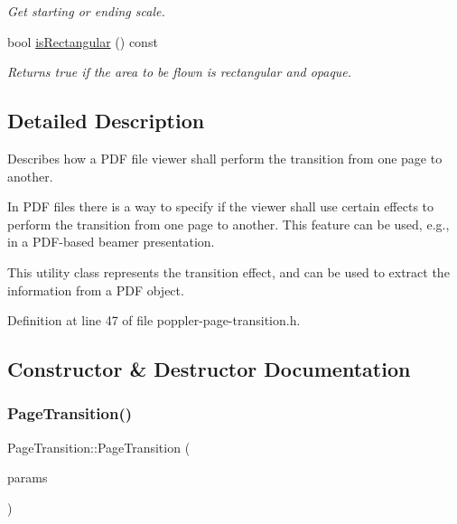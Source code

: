\begin{DoxyCompactItemize}
\begin{DoxyCompactList}\small\item\em Get starting or ending scale. \end{DoxyCompactList}\item 
\mbox{\label{class_poppler_1_1_page_transition_a43ed82dde65f4369f037a35227ee5acd}} 
bool \hyperlink{class_poppler_1_1_page_transition_a43ed82dde65f4369f037a35227ee5acd}{is\+Rectangular} () const
\begin{DoxyCompactList}\small\item\em Returns true if the area to be flown is rectangular and opaque. \end{DoxyCompactList}\end{DoxyCompactItemize}


\subsection{Detailed Description}
Describes how a P\+DF file viewer shall perform the transition from one page to another. 

In P\+DF files there is a way to specify if the viewer shall use certain effects to perform the transition from one page to another. This feature can be used, e.\+g., in a P\+D\+F-\/based beamer presentation.

This utility class represents the transition effect, and can be used to extract the information from a P\+DF object. 

Definition at line 47 of file poppler-\/page-\/transition.\+h.



\subsection{Constructor \& Destructor Documentation}
\mbox{\label{class_poppler_1_1_page_transition_ab6ca077c24641b6ea0323ff1ec50b3e9}} 
\subsubsection{\texorpdfstring{Page\+Transition()}{PageTransition()}}
{\footnotesize\ttfamily Page\+Transition\+::\+Page\+Transition (\begin{DoxyParamCaption}\item[{const \hyperlink{class_poppler_1_1_page_transition_params}{Page\+Transition\+Params} \&}]{params }\end{DoxyParamCaption})}



